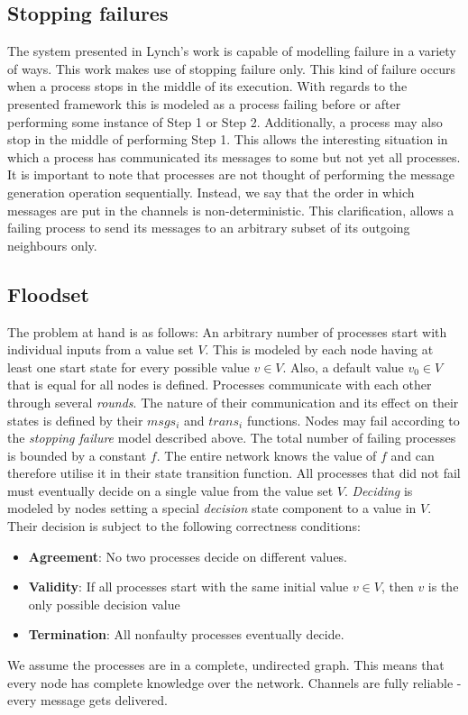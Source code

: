\documentclass[fleqn]{article}
\begin{document}
\subsection{Stopping failures}
The system presented in Lynch's work \cite{refNancy} is capable of modelling failure in a variety of ways.
This work makes use of stopping failure only. This kind of failure occurs when a process stops in the middle of its execution. With regards to the presented framework this
is modeled as a process failing before or after performing some instance of Step 1 or Step 2. Additionally, a process may also stop in the middle of performing Step 1. This allows
the interesting situation in which a process has communicated its messages to some but not yet all processes. It is important to note that processes are not thought of performing
the message generation operation sequentially. Instead, we say that the order in which messages are put in the channels is non-deterministic. This clarification, allows a failing process
to send its messages to an arbitrary subset of its outgoing neighbours only.


\subsection{Floodset}
The problem at hand is as follows: An arbitrary number of processes start with individual inputs from a value set $V$. This is modeled by each node having at least one start state
for every possible value $v ∈ V$. Also, a default value $v_0 ∈ V$ that is equal for all nodes is defined.
Processes communicate with each other through several \textit{rounds}. The nature of their communication and its effect on their states is defined by their $msgs_i$ and $trans_i$ functions.
Nodes may fail according to the \textit{stopping failure} model described above. The total number of failing processes is bounded by a constant $f$. The entire network knows the value of $f$ and
can therefore utilise it in their state transition function.
All processes that did not fail must eventually decide on a single value from the value set $V$. \textit{Deciding} is modeled by nodes setting a special \textit{decision} state component to a value in $V$.
Their decision is subject to the following correctness conditions:
\begin{itemize}
  \item \textbf{Agreement}: No two processes decide on different values.
  \item \textbf{Validity}: If all processes start with the same initial value $v ∈ V$, then $v$ is the only possible decision value
  \item \textbf{Termination}: All nonfaulty processes eventually decide.
\end{itemize}
We assume the processes are in a complete, undirected graph. This means that every node has complete knowledge over the network. Channels are fully reliable - every message gets delivered.
\end{document}
